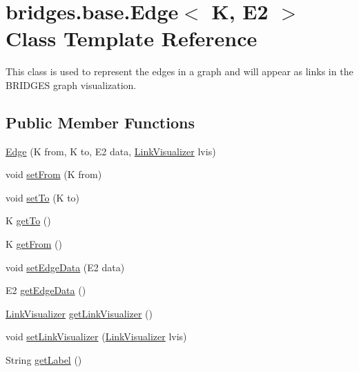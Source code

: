 \hypertarget{classbridges_1_1base_1_1_edge}{}\section{bridges.\+base.\+Edge$<$ K, E2 $>$ Class Template Reference}
\label{classbridges_1_1base_1_1_edge}


This class is used to represent the edges in a graph and will appear as links in the B\+R\+I\+D\+G\+ES graph visualization.  


\subsection*{Public Member Functions}
\begin{DoxyCompactItemize}
\item 
\mbox{\hyperlink{classbridges_1_1base_1_1_edge_a2a17f458612fbcee8e9efb8d91a6cc18}{Edge}} (K from, K to, E2 data, \mbox{\hyperlink{classbridges_1_1base_1_1_link_visualizer}{Link\+Visualizer}} lvis)
\item 
void \mbox{\hyperlink{classbridges_1_1base_1_1_edge_aef1a55d996fc36217629b884435b9f35}{set\+From}} (K from)
\item 
void \mbox{\hyperlink{classbridges_1_1base_1_1_edge_a5e574139711be3f96c42da02a2702aea}{set\+To}} (K to)
\item 
K \mbox{\hyperlink{classbridges_1_1base_1_1_edge_ab451c13aa8173b5ef1cc2b2dd4f8508f}{get\+To}} ()
\item 
K \mbox{\hyperlink{classbridges_1_1base_1_1_edge_afc23a7c2ee8ab4c4f0950c9bf25edd56}{get\+From}} ()
\item 
void \mbox{\hyperlink{classbridges_1_1base_1_1_edge_a733d7f5eb4950d1fc4e14b7096faeb5c}{set\+Edge\+Data}} (E2 data)
\item 
E2 \mbox{\hyperlink{classbridges_1_1base_1_1_edge_a19a623d647eb17b7e53f1360577b0703}{get\+Edge\+Data}} ()
\item 
\mbox{\hyperlink{classbridges_1_1base_1_1_link_visualizer}{Link\+Visualizer}} \mbox{\hyperlink{classbridges_1_1base_1_1_edge_a11c655622b8a54f2931f59b1d256f84a}{get\+Link\+Visualizer}} ()
\item 
void \mbox{\hyperlink{classbridges_1_1base_1_1_edge_a1bb8008507d26245468bf9d0f1452072}{set\+Link\+Visualizer}} (\mbox{\hyperlink{classbridges_1_1base_1_1_link_visualizer}{Link\+Visualizer}} lvis)
\item 
String \mbox{\hyperlink{classbridges_1_1base_1_1_edge_a8663708d930e8df460c57d8bdbab44b2}{get\+Label}} ()

\end{DoxyCompactItemize}
